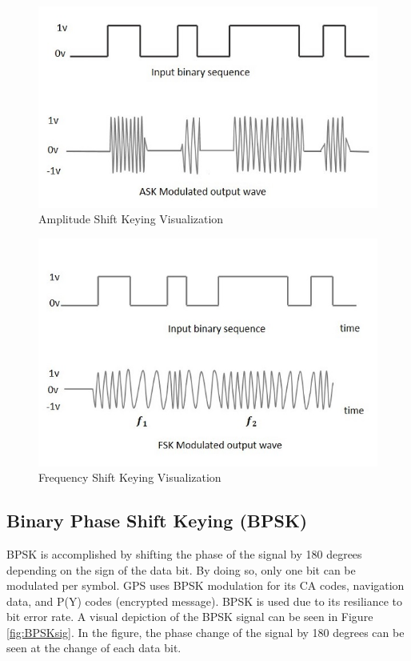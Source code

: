 \documentclass[12pt]{report}
\begin{document}
\begin{figure}[h]

    \centering
    \includegraphics[width=4.5in]{ask_modulated_waveform.jpg}
    \caption{Amplitude Shift Keying Visualization \cite{AmplitudeShiftKeying} }
    \label{fig:ASKsig}

\end{figure}

\begin{figure}[h]

    \centering
    \includegraphics[width=4.5in]{fsk_modulated_output_wave.jpg}
    \caption{Frequency Shift Keying Visualization \cite{FrequencyShiftKeying} }
    \label{fig:FSKsig}

\end{figure}


\subsection{Binary Phase Shift Keying (BPSK)}

BPSK is accomplished by shifting the phase of the signal by 180 degrees depending on the sign of the data bit. By doing so, only one bit can be modulated per symbol. GPS uses BPSK modulation for its CA codes, navigation data, and P(Y) codes (encrypted message). BPSK is used due to its resiliance to bit error rate. A visual depiction of the BPSK signal can be seen in Figure \ref{fig:BPSKsig}. In the figure, the phase change of the signal by 180 degrees can be seen at the change of each data bit. 
\end{document}
